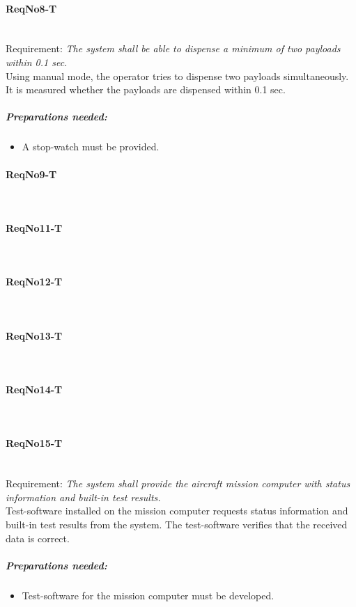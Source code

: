 \paragraph{ReqNo8-T}\mbox{}\\ %
Requirement: \textit{The system shall be able to dispense a minimum of two payloads within 0.1 sec.}
\\
Using manual mode, the operator tries to dispense two payloads simultaneously. It is measured whether the payloads are dispensed within 0.1 sec.
\\
	\subparagraph{Preparations needed:}
	\begin{itemize}
	\item A stop-watch must be provided.
	\end{itemize}

\paragraph{ReqNo9-T}\mbox{}\\ %


\paragraph{ReqNo11-T}\mbox{}\\ %

\paragraph{ReqNo12-T}\mbox{}\\ %


\paragraph{ReqNo13-T}\mbox{}\\ %

\paragraph{ReqNo14-T}\mbox{}\\ %


\paragraph{ReqNo15-T}\mbox{}\\ %
Requirement: \textit{The system shall provide the aircraft mission computer
with status information and built-in test results.}
\\
Test-software installed on the mission computer requests status information and built-in test results from the system. The test-software verifies that the received data is correct.
\\
	\subparagraph{Preparations needed:}
	\begin{itemize}
	\item Test-software for the mission computer must be developed.
	\end{itemize} 

